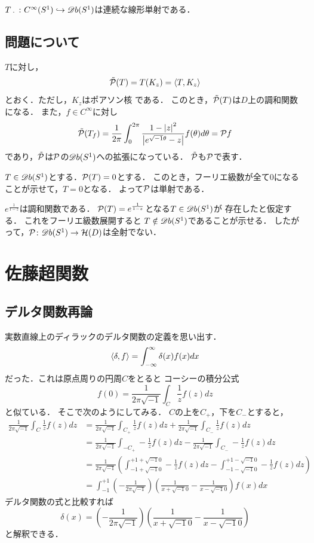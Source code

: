 \begin{PRP}
  \(T_{\mathord{\ \cdot\ }}\colon C^{\infty}(S^1)\hookrightarrow \mathord{\mathscr{D}b}(S^1)\)は連続な線形単射である．
\end{PRP}
\subsection{問題について}

\begin{OBS}
  \(T\)に対し，
  \[
    \tilde{\cP}(T)=T(K_{z})=\inner<T,K_{z}>
  \]
  とおく．ただし，\(K_z\)はポアソン核
  である．
  このとき，\(\tilde{\mathcal{P}}(T)\)は\(D\)上の調和関数になる．
  また，\(f\in C^{\infty}\)に対し
  \[
    \tilde{\mathcal{P}}(T_{f})=\frac{1}{2\pi}\int_{0}^{2\pi}\frac{1-\left|z\right|^2}{\left|e^{\sqrt{-1}\theta}-z\right|}f(\theta) d\theta=\mathcal{P}{f}
  \]
  であり，\(\tilde{\mathcal{P}}\)は\(\mathcal{P}\)の\(\mathord{\mathscr{D}b}(S^1)\)への拡張になっている．
  \(\tilde{\mathcal{P}}\)も\(\mathcal{P}\)で表す．

  \(T\in \mathord{\mathscr{D}b}(S^1)\)とする．\(\mathcal{P}(T)=0\)とする．
  このとき，フーリエ級数が全て0になることが示せて，\(T=0\)となる．
  よって\(\mathcal{P}\)は単射である．

  \(e^{\frac{1}{1-z}}\)は調和関数である．
  \(\mathcal{P}(T)=e^{\frac{1}{1-z}}\)となる\(T\in \mathord{\mathscr{D}b}(S^1)\)が
  存在したと仮定する．
  これをフーリエ級数展開すると
  \(T\notin \mathord{\mathscr{D}b}(S^1)\)であることが示せる．
  したがって，\(\mathcal{P}\colon \mathord{\mathscr{D}b}(S^1)\to \mathcal{H}(D)\)は全射でない．
\end{OBS}


\section{佐藤超関数}

\subsection{デルタ関数再論}
実数直線上のディラックのデルタ関数の定義を思い出す．
\[
  \inner<\delta,f>=\int_{-\infty}^{\infty}\delta(x)f(x)dx
\]
だった．これは原点周りの円周\(C\)をとると
コーシーの積分公式
\[
  f(0)=\frac{1}{2\pi\sqrt{-1}}\int_{C}\frac{1}{z}f(z)dz
\]
と似ている．
そこで次のようにしてみる．
\(C\)の上を\(C_+\)，下を\(C_{-}\)とすると，
\begin{align*}
  \frac{1}{2\pi\sqrt{-1}}\int_{C}\frac{1}{z}f(z)dz
  &=
  \frac{1}{2\pi\sqrt{-1}}\int_{C_{+}}\frac{1}{z}f(z)dz
  +\frac{1}{2\pi\sqrt{-1}}\int_{C_{-}}\frac{1}{z}f(z)dz\\
  &=
  \frac{1}{2\pi\sqrt{-1}}\int_{-C_{+}}-\frac{1}{z}f(z)dz
  -\frac{1}{2\pi\sqrt{-1}}\int_{C_{-}}-\frac{1}{z}f(z)dz\\
  &=
  \frac{1}{2\pi\sqrt{-1}}\left(
  \int_{-1+\sqrt{-1}0}^{+1+\sqrt{-1}0}-\frac{1}{z}f(z)dz
  -\int_{-1-\sqrt{-1}0}^{+1-\sqrt{-1}0}-\frac{1}{z}f(z)dz\right)\\
  &=
  \int_{-1}^{+1}\left(-\frac{1}{2\pi\sqrt{-1}}\right)\left(
  \frac{1}{x+\sqrt{-1}0}
  -\frac{1}{x-\sqrt{-1}0}\right)f(x)dx
\end{align*}
デルタ関数の式と比較すれば
\[
  \delta(x)=\left(-\frac{1}{2\pi\sqrt{-1}}\right)\left(
  \frac{1}{x+\sqrt{-1}0}
  -\frac{1}{x-\sqrt{-1}0}\right)
\]
と解釈できる．
